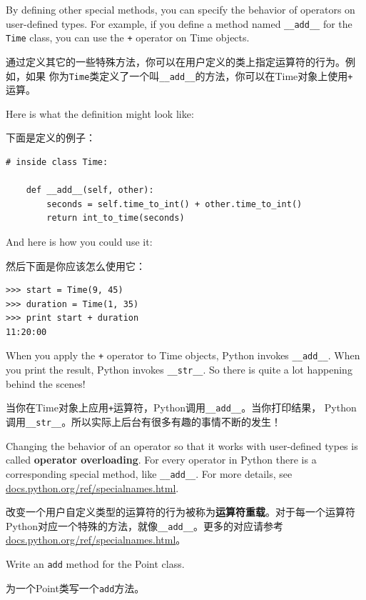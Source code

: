 \documentclass[10pt]{book}
\begin{document}
\begin{CJK}{UTF8}{gbsn}
By defining other special methods, you can specify the behavior
of operators on user-defined types.  For example, if you define
a method named \verb"__add__" for the {\tt Time} class, you can use the
{\tt +} operator on Time objects.

通过定义其它的一些特殊方法，你可以在用户定义的类上指定运算符的行为。例如，如果
你为{\tt Time}类定义了一个叫\verb"__add__"的方法，你可以在Time对象上使用{\tt +}
运算。

Here is what the definition might look like:

下面是定义的例子：

\begin{verbatim}
# inside class Time:

    def __add__(self, other):
        seconds = self.time_to_int() + other.time_to_int()
        return int_to_time(seconds)
\end{verbatim}
%
And here is how you could use it:

然后下面是你应该怎么使用它：

\begin{verbatim}
>>> start = Time(9, 45)
>>> duration = Time(1, 35)
>>> print start + duration
11:20:00
\end{verbatim}
%
When you apply the {\tt +} operator to Time objects, Python invokes
\verb"__add__".  When you print the result, Python invokes 
\verb"__str__".  So there is quite a lot happening behind the scenes!

当你在Time对象上应用{\tt +}运算符，Python调用\verb"__add__"。当你打印结果，
Python调用\verb"__str__"。所以实际上后台有很多有趣的事情不断的发生！

Changing the behavior of an operator so that it works with
user-defined types is called {\bf operator overloading}.  For every
operator in Python there is a corresponding special method, like 
\verb"__add__".  For more details, see
\url{docs.python.org/ref/specialnames.html}.

改变一个用户自定义类型的运算符的行为被称为{\bf 运算符重载}。对于每一个运算符
Python对应一个特殊的方法，就像\verb"__add__"。更多的对应请参考
\url{docs.python.org/ref/specialnames.html}。

\begin{exercise}

Write an {\tt add} method for the Point class.  

为一个Point类写一个{\tt add}方法。

\end{exercise}



\end{CJK}
\end{document}
